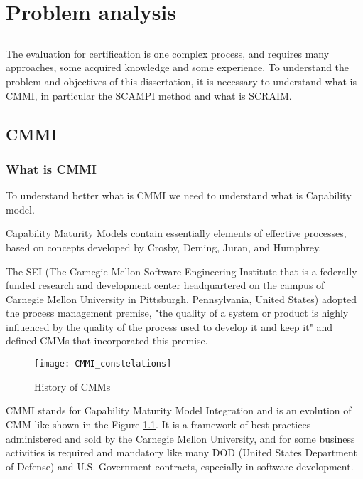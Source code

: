 \chapter{Problem analysis} \label{chap:problem}

\section*{}

The evaluation for certification is one complex process, and requires many approaches, some acquired knowledge and some experience. To understand the problem and objectives of this dissertation, it is necessary to understand what is CMMI, in particular the SCAMPI \citep{SCAMPITeam2013} method and what is SCRAIM.

\section{CMMI}

\subsection{What is CMMI}

To understand better what is CMMI \citep{Development2010} we need to understand what is Capability model.

Capability Maturity Models contain essentially elements of effective processes, based on concepts developed by Crosby, Deming, Juran, and Humphrey.

The SEI (The Carnegie Mellon Software Engineering Institute that is a federally funded research and development center headquartered on the campus of Carnegie Mellon University in Pittsburgh, Pennsylvania, United States) adopted the process management premise, "the quality of a system or product is highly influenced by the quality of the process used to develop it and keep it" and defined CMMs that incorporated this premise.

\begin{figure}[h]
	\begin{center}
		\leavevmode
		\texttt{[image: CMMI\_constelations]}
		\caption{History of CMMs}
		\label{fig:historycmmi}
	\end{center}
\end{figure}


CMMI stands for Capability Maturity Model Integration and is an evolution of CMM like shown in the Figure \ref{fig:historycmmi}.
It is a framework of best practices administered and sold by the Carnegie Mellon University, and for some business activities is required and mandatory like many DOD (United States Department of Defense) and U.S. Government contracts, especially in software development.


